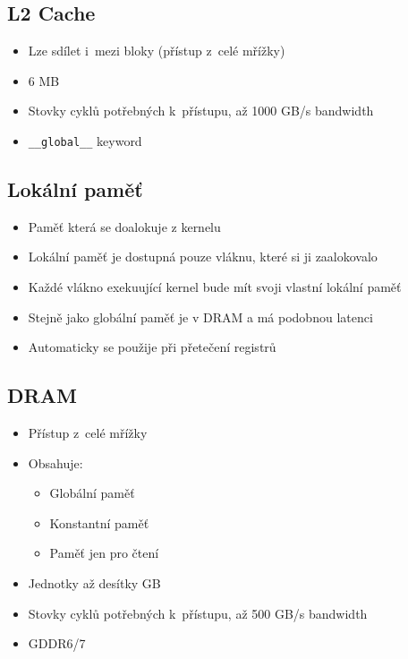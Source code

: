 \subsection{L2 Cache}
\begin{itemize}
    \item Lze sdílet i~mezi bloky (přístup z~celé mřížky)
    \item 6 MB
    \item Stovky cyklů potřebných k~přístupu, až 1000 GB/s bandwidth
    \item \texttt{\_\_global\_\_} keyword
\end{itemize}

\subsection{Lokální paměť}
\begin{itemize}
    \item Paměť která se doalokuje z kernelu
    \item Lokální paměť je dostupná pouze vláknu, které si ji zaalokovalo
    \item Každé vlákno exekuující kernel bude mít svoji vlastní lokální paměť
    \item Stejně jako globální paměť je v DRAM a má podobnou latenci
    \item Automaticky se použije při přetečení registrů
\end{itemize}
\subsection{DRAM}
\begin{itemize}
    \item Přístup z~celé mřížky
    \item Obsahuje:
    \begin{itemize}
        \item Globální paměť
        \item Konstantní paměť
        \item Paměť jen pro čtení
    \end{itemize}
    \item Jednotky až desítky GB
    \item Stovky cyklů potřebných k~přístupu, až 500 GB/s bandwidth
    \item GDDR6/7
\end{itemize}

